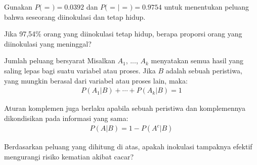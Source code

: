 \begin{exercisewrap}
\begin{nexercise}
Gunakan $P($ = $) = 0.0392$ dan $P($ =  $|$  = $) = 0.9754$ untuk menentukan peluang bahwa seseorang diinokulasi dan tetap hidup.\footnotemark
\end{nexercise}
\end{exercisewrap}


\begin{exercisewrap}
\begin{nexercise}
Jika 97,54\% orang yang diinokulasi tetap hidup,
berapa proporsi orang yang diinokulasi yang meninggal?\footnotemark{}
\end{nexercise}
\end{exercisewrap}

\begin{onebox}{Jumlah peluang bersyarat}
Misalkan $A_1$, ..., $A_k$ menyatakan semua hasil yang saling lepas bagi suatu variabel atau proses. Jika $B$ adalah sebuah peristiwa, yang mungkin berasal dari variabel atau proses lain, maka: \vspace{-1mm}
\begin{align*}
P(A_1|B) + \cdots + P(A_k|B) = 1
\end{align*}%
\vspace{-5.5mm} \par
Aturan komplemen juga berlaku apabila sebuah peristiwa dan komplemennya dikondisikan pada informasi yang sama: \vspace{-1.5mm}
\begin{align*}
P(A | B) = 1 - P(A^c | B)
\end{align*}
\end{onebox}

\begin{exercisewrap}
\begin{nexercise}
Berdasarkan peluang yang dihitung di atas, apakah inokulasi tampaknya efektif mengurangi risiko kematian akibat cacar?\footnotemark
\end{nexercise}
\end{exercisewrap}


